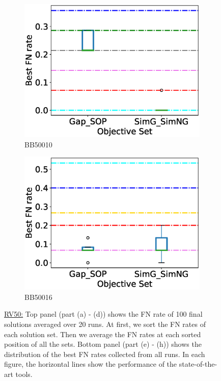 \begin{figure}[!htbp]
\begin{adjustwidth}{-1cm}{-1cm}
\begin{subfigure}{0.22\textwidth}
			\includegraphics[width=\columnwidth]{Figure/summary/precomputedInit/Balibase/BB50010_objset_fnrate_rank}
			\caption{BB50010}
		\end{subfigure}
		\begin{subfigure}{0.22\textwidth}
			\includegraphics[width=\columnwidth]{Figure/summary/precomputedInit/Balibase/BB50016_objset_fnrate_rank}
			\caption{BB50016}
		\end{subfigure}
		\caption{\underline{RV50:} Top panel (part (a) - (d)) shows the FN rate of 100 final solutions averaged over 20 runs. At first, we sort the FN rates of each solution set. Then we average the FN rates at each sorted position of all the sets. Bottom panel (part (e) - (h)) shows the distribution of the best FN rates collected from all runs. In each figure, the horizontal lines show the performance of the state-of-the-art tools.}
		\label{fig:rv50_fn_rate}
	\end{adjustwidth}
\end{figure}


